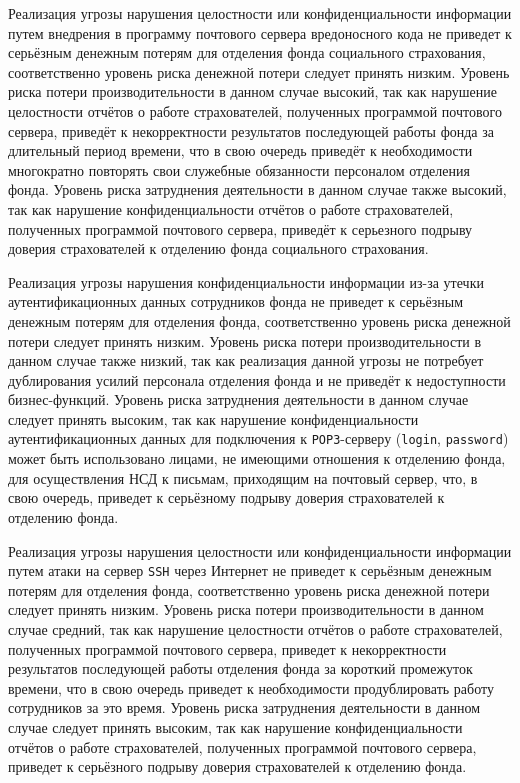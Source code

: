 \point Реализация угрозы нарушения целостности или конфиденциальности
информации путем внедрения в программу почтового сервера вредоносного
кода не приведет к серьёзным денежным потерям для отделения фонда
социального страхования, соответственно уровень риска денежной потери
следует принять низким. Уровень риска потери производительности в
данном случае высокий, так как нарушение целостности отчётов о работе
страхователей, полученных программой почтового сервера, приведёт к
некорректности результатов последующей работы фонда за длительный
период времени, что в свою очередь приведёт к необходимости
многократно повторять свои служебные обязанности персоналом отделения
фонда. Уровень риска затруднения деятельности в данном случае также
высокий, так как нарушение конфиденциальности отчётов о работе
страхователей, полученных программой почтового сервера, приведёт к
серьезного подрыву доверия страхователей к отделению фонда социального
страхования.

\point Реализация угрозы нарушения конфиденциальности информации из-за
утечки аутентификационных данных сотрудников фонда не приведет к
серьёзным денежным потерям для отделения фонда, соответственно уровень
риска денежной потери следует принять низким. Уровень риска потери
производительности в данном случае также низкий, так как реализация
данной угрозы не потребует дублирования усилий персонала отделения
фонда и не приведёт к недоступности бизнес-функций. Уровень риска
затруднения деятельности в данном случае следует принять высоким, так
как нарушение конфиденциальности аутентификационных данных для
подключения к \texttt{POP3}-серверу (\texttt{login},
\texttt{password}) может быть использовано лицами, не имеющими
отношения к отделению фонда, для осуществления НСД к письмам,
приходящим на почтовый сервер, что, в свою очередь, приведет к
серьёзному подрыву доверия страхователей к отделению фонда.

\point Реализация угрозы нарушения целостности или конфиденциальности
информации путем атаки на сервер \texttt{SSH} через Интернет не
приведет к серьёзным денежным потерям для отделения фонда,
соответственно уровень риска денежной потери следует принять
низким. Уровень риска потери производительности в данном случае
средний, так как нарушение целостности отчётов о работе страхователей,
полученных программой почтового сервера, приведет к некорректности
результатов последующей работы отделения фонда за короткий промежуток
времени, что в свою очередь приведет к необходимости продублировать
работу сотрудников за это время. Уровень риска затруднения
деятельности в данном случае следует принять высоким, так как
нарушение конфиденциальности отчётов о работе страхователей,
полученных программой почтового сервера, приведет к серьёзного подрыву
доверия страхователей к отделению фонда.

